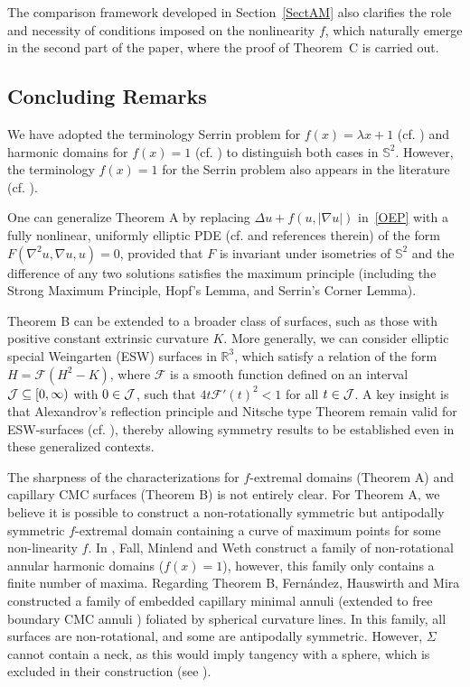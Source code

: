 \documentclass[11pt]{article}
\numberwithin{equation} {section}
\begin{document}
The comparison framework developed in Section~\ref{SectAM} also clarifies the role and necessity of conditions imposed on the nonlinearity $f$, which naturally emerge in the second part of the paper, where the proof of Theorem~C is carried out.

\subsection{Concluding Remarks}

We have adopted the terminology Serrin problem for $f(x) = \lambda x +1$ (cf. \cite{CV}) and harmonic domains for $f(x) =1$ (cf. \cite{Savo}) to distinguish both cases in $\mathbb{S}^2$. However, the terminology $f(x) =1$ for the Serrin problem also appears in the literature (cf. \cite{FM}).

One can generalize Theorem A by replacing $\Delta u + f(u, |\nabla u|)$ in~\eqref{OEP} with a fully nonlinear, uniformly elliptic PDE (cf. \cite{BirDem} and references therein) of the form $F(\nabla^2 u, \nabla u, u) = 0$, provided that $F$ is invariant under isometries of $\mathbb{S}^2$ and the difference of any two solutions satisfies the maximum principle (including the Strong Maximum Principle, Hopf's Lemma, and Serrin's Corner Lemma).

Theorem B can be extended to a broader class of surfaces, such as those with positive constant extrinsic curvature \(K \). More generally, we can consider elliptic special Weingarten (ESW) surfaces in \(\mathbb{R}^3\), which satisfy a relation of the form \(H = \mathcal{F}(H^2 - K)\), where \(\mathcal{F}\) is a smooth function defined on an interval \({\cal J} \subseteq [0,\infty)\) with \(0 \in {\cal J}\), such that \(4t\mathcal{F}'(t)^2 < 1\) for all \(t \in {\cal J}\). A key insight is that Alexandrov's reflection principle and Nitsche type Theorem remain valid for ESW-surfaces (cf. \cite{AEG,EspFer}), thereby allowing symmetry results to be established even in these generalized contexts.

The sharpness of the characterizations for $f$-extremal domains (Theorem A) and capillary CMC surfaces (Theorem B) is not entirely clear. For Theorem A, we believe it is possible to construct a non-rotationally symmetric but antipodally symmetric $f$-extremal domain containing a curve of maximum points for some non-linearity $f$. In \cite{FMW}, Fall, Minlend and Weth construct a family of non-rotational annular harmonic domains ($f(x)=1$), however, this family only contains a finite number of maxima. Regarding Theorem B, Fernández, Hauswirth and Mira \cite{FHM} constructed a family of embedded capillary minimal annuli (extended to free boundary CMC annuli \cite{CMF}) foliated by spherical curvature lines. In this family, all surfaces are non-rotational, and some are antipodally symmetric. However, $\Sigma$ cannot contain a neck, as this would imply tangency with a sphere, which is excluded in their construction (see \cite[Remark 2.4]{CMF}).
\end{document}

